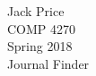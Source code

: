 \documentclass{article}
\begin{document}
\noindent Jack Price\\
COMP 4270\\
Spring 2018\\
Journal Finder\\
\nocite{*}


\end{document}

